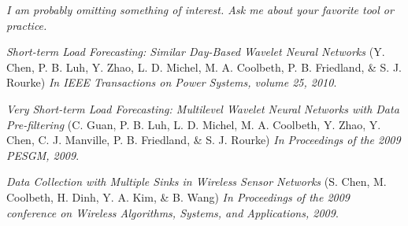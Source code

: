 \documentclass[11pt,a4paper,sans]{moderncv} %
\begin{document}
{\em I am probably omitting something of interest.  Ask me about your favorite tool or practice.}

\begin{thebibliography}{1}

	 {\em Short-term Load Forecasting: Similar Day-Based Wavelet Neural Networks}
		(Y. Chen, P. B. Luh, Y. Zhao, L. D. Michel, M. A. Coolbeth, P. B. Friedland, \& S. J. Rourke)
		{\em In IEEE Transactions on Power Systems, volume 25, 2010}.

	 {\em Very Short-term Load Forecasting: Multilevel Wavelet Neural Networks with Data
		Pre-filtering}
		(C. Guan, P. B. Luh, L. D. Michel, M. A. Coolbeth, Y. Zhao, Y. Chen, C. J. Manville, P. B. Friedland,
		\& S. J. Rourke)
		{\em In Proceedings of the 2009 PESGM, 2009}.

	 {\em Data Collection with Multiple Sinks in Wireless Sensor Networks} 
		(S. Chen, M. Coolbeth, H. Dinh, Y. A. Kim, \& B. Wang)
		{\em In Proceedings of the 2009 conference on Wireless Algorithms, Systems, and Applications, 2009}.

\end{thebibliography}
\end{document}
